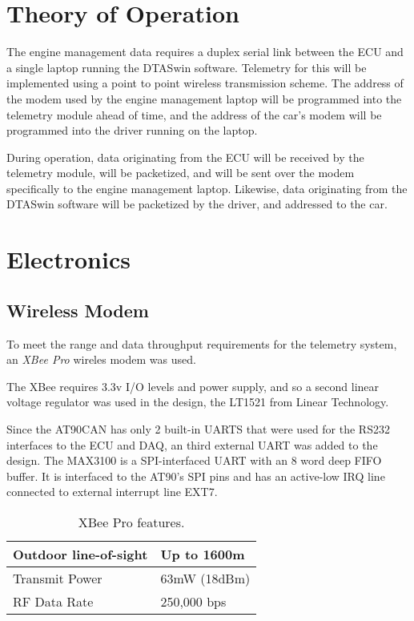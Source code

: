 \documentclass[a4paper,10pt]{scrreprt}
\begin{document}
\section{Theory of Operation}

The engine management data requires a duplex serial link between the ECU and a single laptop running the DTASwin software. Telemetry for this will be implemented using a point to point wireless transmission scheme. The address of the modem used by the engine management laptop will be programmed into the telemetry module ahead of time, and the address of the car's modem will be programmed into the driver running on the laptop.

During operation, data originating from the ECU will be received by the telemetry module, will be packetized, and will be sent over the modem specifically to the engine management laptop. Likewise, data originating from the DTASwin software will be packetized by the driver, and addressed to the car.

\section{Electronics}

\subsection{Wireless Modem}

To meet the range and data throughput requirements for the telemetry system, an \emph{XBee Pro} wireles modem was used.

The XBee requires 3.3v I/O levels and power supply, and so a second linear voltage regulator was used in the design, the LT1521 from Linear Technology.

Since the AT90CAN has only 2 built-in UARTS that were used for the RS232 interfaces to the ECU and DAQ, an third external UART was added to the design. The MAX3100 is a SPI-interfaced UART with an 8 word deep FIFO buffer. It is interfaced to the AT90's SPI pins and has an active-low IRQ line connected to external interrupt line EXT7.

\begin{table}
  \centering
  \caption{XBee Pro features.}
    \begin{tabular}{|l|l|}
      \hline
      Outdoor line-of-sight & Up to 1600m\\\hline
      Transmit Power & 63mW (18dBm)\\\hline
      RF Data Rate & 250,000 bps\\
      \hline
    \end{tabular}
\end{table}
\end{document}
